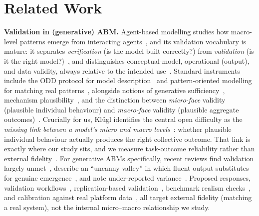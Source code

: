 \documentclass[runningheads]{llncs}
\begin{document}
\section{Related Work}\label{sec:related}
\textbf{Validation in (generative) ABM.} Agent-based modelling studies how macro-level patterns emerge from interacting agents~\cite{epstein1996growing}, and its validation vocabulary is mature: it separates \emph{verification} (is the model built correctly?) from \emph{validation} (is it the right model?)~\cite{sargent2010verification,rand2011rigor}, and distinguishes conceptual-model, operational (output), and data validity, always relative to the intended use~\cite{sargent2010verification,augusiak2014evaludation}. Standard instruments include the ODD protocol for model description~\cite{grimm2006odd,grimm2020odd} and pattern-oriented modelling for matching real patterns~\cite{grimm2005pom}, alongside notions of generative sufficiency~\cite{moss2005towards}, mechanism plausibility~\cite{zhao2026mechanism}, and the distinction between \emph{micro-face} validity (plausible individual behaviour) and \emph{macro-face} validity (plausible aggregate outcomes)~\cite{windrum2007empirical}. Crucially for us, Kl\"ugl identifies the central open difficulty as the \emph{missing link between a model's micro and macro levels}~\cite{kluegl2008validation}: whether plausible individual behaviour actually produces the right collective outcome. That link is exactly where our study sits, and we measure task-outcome reliability rather than external fidelity~\cite{augusiak2014evaludation}. For generative ABMs specifically, recent reviews find validation largely unmet~\cite{larooij2025critical}, describe an ``uncanny valley'' in which fluent output substitutes for genuine emergence~\cite{zeng2026uncanny}, and note under-reported variance~\cite{wu2026boundary}. Proposed responses, validation workflows~\cite{adornetto2025overview}, replication-based validation~\cite{cross2025validating}, benchmark realism checks~\cite{munker2026benchmark}, and calibration against real platform data~\cite{tomasevic2026operational}, all target external fidelity (matching a real system), not the internal micro--macro relationship we study.
\end{document}
